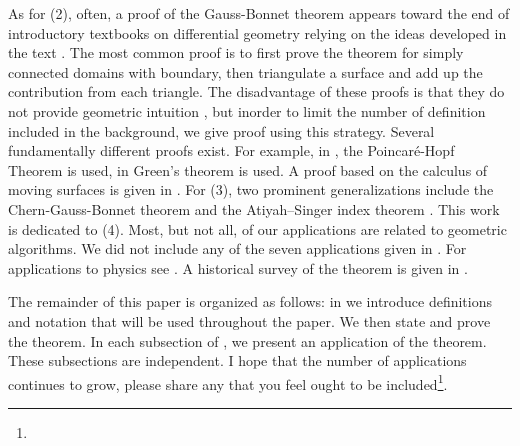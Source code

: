  
As for (2), often, a proof of the Gauss-Bonnet theorem appears toward
the end of introductory textbooks on differential geometry relying on the ideas
developed in the text \cite{guillemin_differential_2010,pressley_elementary_2010}.
The most common proof is to first prove the theorem for simply connected domains
with boundary, then triangulate a surface and add up the contribution from each triangle.
The disadvantage of these proofs is that they do not provide geometric intuition \cite{wu_historical_2008},
but inorder to limit the number of definition included in the background,
we give proof using this strategy.
Several fundamentally different proofs exist.
For example, in \cite{guillemin_differential_2010}, 
the Poincar\'{e}-Hopf Theorem is used,
in \cite{doc76} Green's theorem is used.
A proof based on the calculus of
moving surfaces is given in \cite{grinfeld_introduction_2013}.
For (3), two prominent generalizations include
the Chern-Gauss-Bonnet theorem \cite{chern_simple_1944} and the Atiyah–Singer index 
theorem \cite{atiyah_index_1963}.
This work is dedicated to (4).
Most, but not all, of our applications are related to geometric algorithms. 
We did not include any of the seven applications given in \cite{doc76}.
For applications to physics see \cite{tirado-physics-apps,gibbons_applications_2008}.
A historical survey of the theorem is given in \cite{wu_historical_2008}.




The remainder of this paper is organized as follows:
in  we introduce definitions and notation that will be used
throughout the paper. We then state and prove the theorem.
In each subsection of , we present an application of the theorem.
These subsections are independent.
I hope that the number of applications continues to grow,
please share any that you feel
ought to be included\footnote{}.

